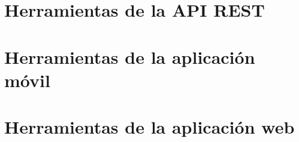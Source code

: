 
\appendix
\clearpage
\addappheadtotoc
\appendixpage


\chapter{Herramientas de la API REST\label{anexo:api-rest}}



\chapter{Herramientas de la aplicación móvil \label{anexo:app-android}}


\chapter{Herramientas de la aplicación web\label{anexo:app-web}}

